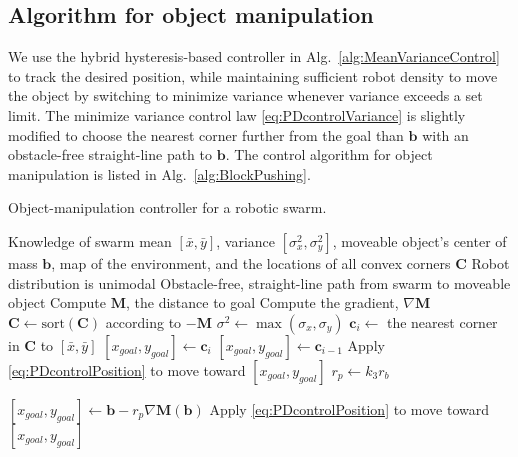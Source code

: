 \subsection{Algorithm for object manipulation}
 We use the hybrid hysteresis-based controller in Alg.~\ref{alg:MeanVarianceControl}  to track the desired position, while maintaining sufficient robot density to move the object by switching to minimize variance whenever variance exceeds a set limit. The minimize variance control law \eqref{eq:PDcontrolVariance} is slightly modified to choose the nearest corner further from the goal than $\mathbf{b}$ with an obstacle-free straight-line path to $\mathbf{b}$. 
The control algorithm  for object manipulation is listed in Alg.~\ref{alg:BlockPushing}. 


\begin{algorithm}
\caption{Object-manipulation controller for a robotic swarm.}\label{alg:BlockPushing}
\begin{algorithmic}[1]
\Require Knowledge of swarm mean $[\bar{x},\bar{y}]$, variance $[\sigma_x^2, \sigma_y^2]$,  moveable object's center of mass $\mathbf{b}$, map of the environment, and the locations of all convex corners $\mathbf{C}$
\Require Robot distribution is unimodal
\Require Obstacle-free, straight-line path from swarm to moveable object
\State Compute $\mathbf{M}$, the distance to goal     
\State Compute the gradient, $\nabla \mathbf{M}$
\State $\mathbf{C} \gets \mathrm{sort(\mathbf{C})}$ according to $-\mathbf{M}$
\State $\sigma^2 \gets \max{(\sigma_x,\sigma_y)}$
\State $\mathbf{c}_i \gets$ the nearest corner in $\mathbf{C}$ to $[\bar{x},\bar{y}]$
\State $ [x_{goal}, y_{goal}] \gets \mathbf{c}_i $
\State  $[x_{goal}, y_{goal}] \gets  \mathbf{c}_{i-1}$ 
\State Apply \eqref{eq:PDcontrolPosition} to move toward $[x_{goal}, y_{goal}]$
\EndIf
\EndWhile
\Else  
\State$r_p \gets k_3 r_b$  

\State $[x_{goal}, y_{goal}] \gets \mathbf{b} - r_p \nabla \mathbf{M}(\mathbf{b})$ 
\EndIf
\State Apply \eqref{eq:PDcontrolPosition} to move toward $[x_{goal}, y_{goal}]$
\EndWhile
\end{algorithmic}
\end{algorithm}


